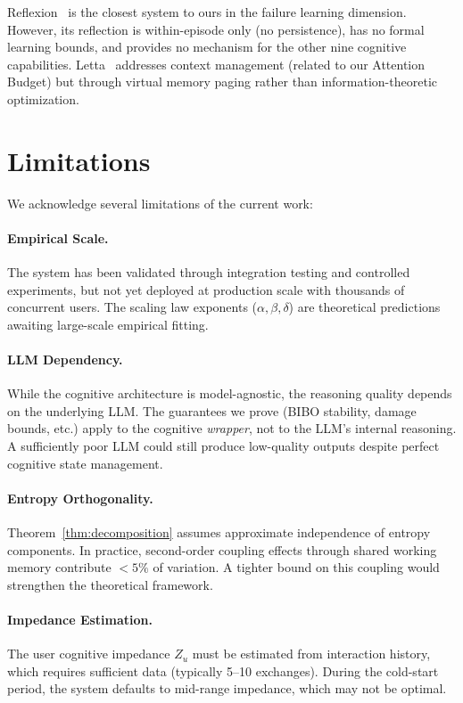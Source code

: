 \documentclass[11pt,a4paper]{article}
\begin{document}
Reflexion~\cite{reflexion} is the closest system to ours in the failure
learning dimension. However, its reflection is within-episode only
(no persistence), has no formal learning bounds, and provides no mechanism
for the other nine cognitive capabilities. Letta~\cite{letta} addresses
context management (related to our Attention Budget) but through virtual
memory paging rather than information-theoretic optimization.


\section{Limitations}

We acknowledge several limitations of the current work:

\paragraph{Empirical Scale.}
The system has been validated through integration testing and controlled
experiments, but not yet deployed at production scale with thousands of
concurrent users. The scaling law exponents ($\alpha, \beta, \delta$) are
theoretical predictions awaiting large-scale empirical fitting.

\paragraph{LLM Dependency.}
While the cognitive architecture is model-agnostic, the reasoning quality
depends on the underlying LLM. The guarantees we prove (BIBO stability,
damage bounds, etc.) apply to the cognitive \emph{wrapper}, not to the
LLM's internal reasoning. A sufficiently poor LLM could still produce
low-quality outputs despite perfect cognitive state management.

\paragraph{Entropy Orthogonality.}
Theorem~\ref{thm:decomposition} assumes approximate independence of
entropy components. In practice, second-order coupling effects through
shared working memory contribute $<5\%$ of variation. A tighter bound
on this coupling would strengthen the theoretical framework.

\paragraph{Impedance Estimation.}
The user cognitive impedance $Z_u$ must be estimated from interaction
history, which requires sufficient data (typically 5--10 exchanges).
During the cold-start period, the system defaults to mid-range impedance,
which may not be optimal.
\end{document}
